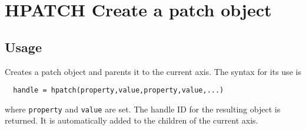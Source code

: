 \section{HPATCH Create a patch object}

\subsection{Usage}

Creates a patch object and parents it to the current axis.  The
syntax for its use is 
\begin{verbatim}
  handle = hpatch(property,value,property,value,...)
\end{verbatim}
where \verb|property| and \verb|value| are set.  The handle ID for the
resulting object is returned.  It is automatically added to
the children of the current axis.
